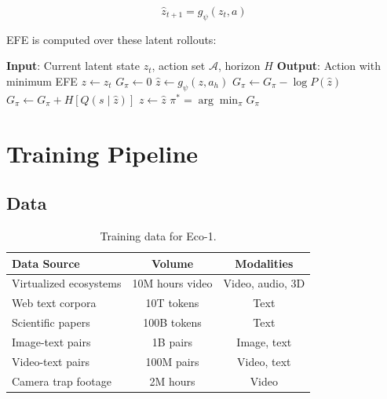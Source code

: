 \documentclass[11pt,letterpaper]{article}
\begin{document}
\begin{equation}
\hat{z}_{t+1} = g_\psi(z_t, a)
\end{equation}

EFE is computed over these latent rollouts:

\begin{algorithm}[t]
\caption{EFE Latent Planning in Eco-1}
\label{alg:efe_plan}
\begin{algorithmic}[1]
\STATE \textbf{Input}: Current latent state $z_t$, action set $\mathcal{A}$, horizon $H$
\STATE \textbf{Output}: Action with minimum EFE
    \STATE $z \leftarrow z_t$
    \STATE $G_\pi \leftarrow 0$
        \STATE $\hat{z} \leftarrow g_\psi(z, a_h)$ 
        \STATE $G_\pi \leftarrow G_\pi - \log P(\hat{z})$ 
        \STATE $G_\pi \leftarrow G_\pi + H[Q(s \mid \hat{z})]$ 
        \STATE $z \leftarrow \hat{z}$
    \ENDFOR
\ENDFOR
\RETURN $\pi^* = \arg\min_\pi G_\pi$
\end{algorithmic}
\end{algorithm}

\section{Training Pipeline}

\subsection{Data}

\begin{table}[t]
\centering
\begin{tabular}{lcc}
\toprule
\textbf{Data Source} & \textbf{Volume} & \textbf{Modalities} \\
\midrule
Virtualized ecosystems & 10M hours video & Video, audio, 3D \\
Web text corpora & 10T tokens & Text \\
Scientific papers & 100B tokens & Text \\
Image-text pairs & 1B pairs & Image, text \\
Video-text pairs & 100M pairs & Video, text \\
Camera trap footage & 2M hours & Video \\
\bottomrule
\end{tabular}
\caption{Training data for Eco-1.}
\label{tab:data}
\end{table}
\end{document}
